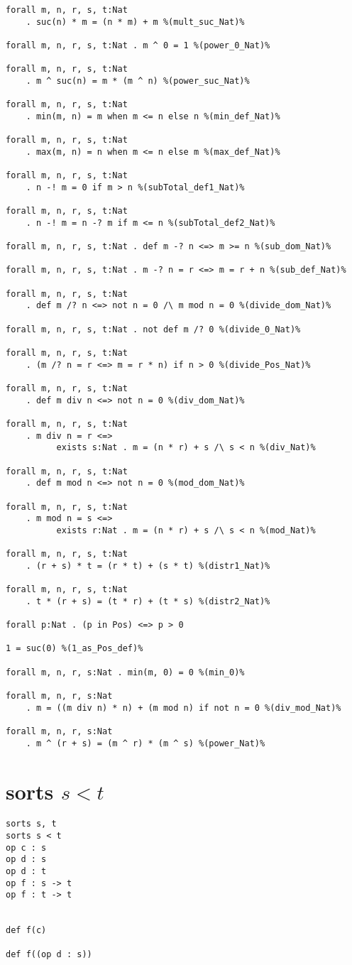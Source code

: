 \documentclass[11pt,a4paper]{article}
\begin{document}
\begin{verbatim}
forall m, n, r, s, t:Nat
    . suc(n) * m = (n * m) + m %(mult_suc_Nat)%

forall m, n, r, s, t:Nat . m ^ 0 = 1 %(power_0_Nat)%

forall m, n, r, s, t:Nat
    . m ^ suc(n) = m * (m ^ n) %(power_suc_Nat)%

forall m, n, r, s, t:Nat
    . min(m, n) = m when m <= n else n %(min_def_Nat)%

forall m, n, r, s, t:Nat
    . max(m, n) = n when m <= n else m %(max_def_Nat)%

forall m, n, r, s, t:Nat
    . n -! m = 0 if m > n %(subTotal_def1_Nat)%

forall m, n, r, s, t:Nat
    . n -! m = n -? m if m <= n %(subTotal_def2_Nat)%

forall m, n, r, s, t:Nat . def m -? n <=> m >= n %(sub_dom_Nat)%

forall m, n, r, s, t:Nat . m -? n = r <=> m = r + n %(sub_def_Nat)%

forall m, n, r, s, t:Nat
    . def m /? n <=> not n = 0 /\ m mod n = 0 %(divide_dom_Nat)%

forall m, n, r, s, t:Nat . not def m /? 0 %(divide_0_Nat)%

forall m, n, r, s, t:Nat
    . (m /? n = r <=> m = r * n) if n > 0 %(divide_Pos_Nat)%

forall m, n, r, s, t:Nat
    . def m div n <=> not n = 0 %(div_dom_Nat)%

forall m, n, r, s, t:Nat
    . m div n = r <=>
          exists s:Nat . m = (n * r) + s /\ s < n %(div_Nat)%

forall m, n, r, s, t:Nat
    . def m mod n <=> not n = 0 %(mod_dom_Nat)%

forall m, n, r, s, t:Nat
    . m mod n = s <=>
          exists r:Nat . m = (n * r) + s /\ s < n %(mod_Nat)%

forall m, n, r, s, t:Nat
    . (r + s) * t = (r * t) + (s * t) %(distr1_Nat)%

forall m, n, r, s, t:Nat
    . t * (r + s) = (t * r) + (t * s) %(distr2_Nat)%

forall p:Nat . (p in Pos) <=> p > 0

1 = suc(0) %(1_as_Pos_def)%

forall m, n, r, s:Nat . min(m, 0) = 0 %(min_0)%

forall m, n, r, s:Nat
    . m = ((m div n) * n) + (m mod n) if not n = 0 %(div_mod_Nat)%

forall m, n, r, s:Nat
    . m ^ (r + s) = (m ^ r) * (m ^ s) %(power_Nat)%

\end{verbatim}

\section*{sorts $s < t$}
\begin{verbatim}
sorts s, t
sorts s < t
op c : s
op d : s
op d : t
op f : s -> t
op f : t -> t


def f(c)

def f((op d : s))
\end{verbatim}
\end{document}
